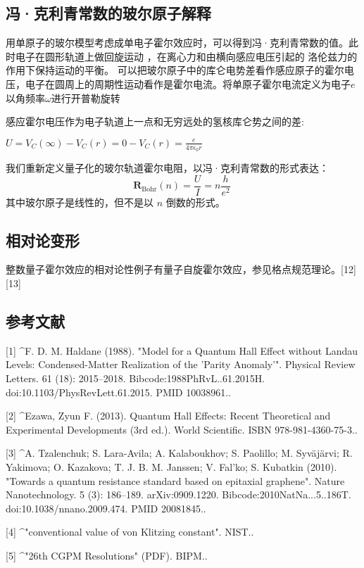 \subsection{冯·克利青常数的玻尔原子解释}
用单原子的玻尔模型考虑成单电子霍尔效应时，可以得到冯·克利青常数的值。此时电子在圆形轨道上做回旋运动 ，在离心力和由横向感应电压引起的 洛伦兹力的作用下保持运动的平衡。 可以把玻尔原子中的库仑电势差看作感应原子的霍尔电压，电子在圆周上的周期性运动看作是霍尔电流。将单原子霍尔电流定义为电子$e$以角频率$\omega$进行开普勒旋转

感应霍尔电压作为电子轨道上一点和无穷远处的氢核库仑势之间的差:

$U = V_C(\infty) - V_C(r) = 0 - V_C(r) = \frac{e}{4 \pi \epsilon_0 r}$

我们重新定义量子化的玻尔轨道霍尔电阻，以冯·克利青常数的形式表达：
\begin{equation}
\mathbf{R}_{\text{Bohr}}(n) = \frac{U}{I} = n \frac{h}{e^2}~
\end{equation}
其中玻尔原子是线性的，但不是以 $n$ 倒数的形式。

\subsection{相对论变形}
整数量子霍尔效应的相对论性例子有量子自旋霍尔效应，参见格点规范理论。[12][13]

\subsection{参考文献}
[1]
^F. D. M. Haldane (1988). "Model for a Quantum Hall Effect without Landau Levels: Condensed-Matter Realization of the 'Parity Anomaly'". Physical Review Letters. 61 (18): 2015–2018. Bibcode:1988PhRvL..61.2015H. doi:10.1103/PhysRevLett.61.2015. PMID 10038961..

[2]
^Ezawa, Zyun F. (2013). Quantum Hall Effects: Recent Theoretical and Experimental Developments (3rd ed.). World Scientific. ISBN 978-981-4360-75-3..

[3]
^A. Tzalenchuk; S. Lara-Avila; A. Kalaboukhov; S. Paolillo; M. Syväjärvi; R. Yakimova; O. Kazakova; T. J. B. M. Janssen; V. Fal'ko; S. Kubatkin (2010). "Towards a quantum resistance standard based on epitaxial graphene". Nature Nanotechnology. 5 (3): 186–189. arXiv:0909.1220. Bibcode:2010NatNa...5..186T. doi:10.1038/nnano.2009.474. PMID 20081845..

[4]
^"conventional value of von Klitzing constant". NIST..

[5]
^"26th CGPM Resolutions" (PDF). BIPM..

